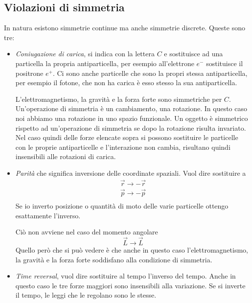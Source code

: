 \subsection{Violazioni di simmetria}
In natura esistono simmetrie continue ma anche simmetrie discrete.
Queste sono tre:
\begin{itemize}
\item \emph{Coniugazione di carica}, si indica con la lettera $C$ e sostituisce ad una particella la propria antiparticella, per esempio all'elettrone $e^-$ sostituisce il positrone $e^+$.
Ci sono anche particelle che sono la propri stessa antiparticella, per esempio il fotone, che non ha carica è esso stesso la sua antiparticella.

L'elettromagnetismo, la gravità e la forza forte sono simmetriche per $C$.
Un'operazione di simmetria è un cambiamento, una rotazione. 
In questo caso noi abbiamo una rotazione in uno spazio funzionale.
Un oggetto è simmetrico rispetto ad un'operazione di simmetria se dopo la rotazione risulta invariato.
Nel caso quindi delle forze elencate sopra si possono sostituire le particelle con le proprie antiparticelle e l'interazione non cambia, risultano quindi insensibili alle rotazioni di carica.

\item \emph{Parità} che significa inversione delle coordinate spaziali.
Vuol dire sostituire a 
\begin{equation}
\begin{split}
\vec{r}\to -\vec{r}\\
\vec{p}\to -\vec{p}\\
\end{split}
\end{equation}
Se io inverto posizione o quantità di moto delle varie particelle ottengo esattamente l'inverso.

Ciò non avviene nel caso del momento angolare 
\begin{equation}
\vec{L}\to \vec{L}
\end{equation}
Quello però che si può vedere è che anche in questo caso l'elettromagnetismo, la gravità e la forza forte soddisfano alla condizione di simmetria.

\item \emph{Time reversal}, vuol dire sostituire al tempo l'inverso del tempo.
Anche in questo caso le tre forze maggiori sono insensibili alla variazione.
Se si inverte il tempo, le leggi che le regolano sono le stesse.
\end{itemize}

